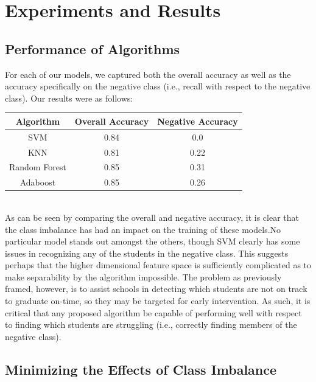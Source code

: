 \documentclass[conference]{IEEEtran}
\begin{document}
\section{Experiments and Results}

\subsection{Performance of Algorithms}

For each of our models, we captured both the overall accuracy as well as the accuracy specifically on the negative class (i.e., recall with respect to the negative class). Our results
were as follows:\\

\begin{tabular}{| c | c | c |}
\hline
Algorithm & Overall Accuracy & Negative Accuracy\\
\hline
SVM & 0.84 & 0.0\\
KNN & 0.81 & 0.22 \\
Random Forest & 0.85 & 0.31\\
Adaboost & 0.85 & 0.26\\
\hline
\end{tabular}
$\;$\\
As can be seen by comparing the overall and negative accuracy, it is clear that the class imbalance has had an impact on the training of these models.No particular model stands out amongst the others, though SVM clearly has some issues in recognizing any of the students in the negative class. This suggests perhaps that the higher dimensional feature space is sufficiently complicated as to make separability by the algorithm impossible. The problem as previously framed, however, is to assist schools in detecting which students are not on track to graduate on-time, so they may be targeted for early intervention. As such, it is critical that any proposed algorithm be capable of performing well with respect to finding which students are struggling (i.e., correctly finding members of the negative class).\\

\subsection{Minimizing the Effects of Class Imbalance}
\end{document}
